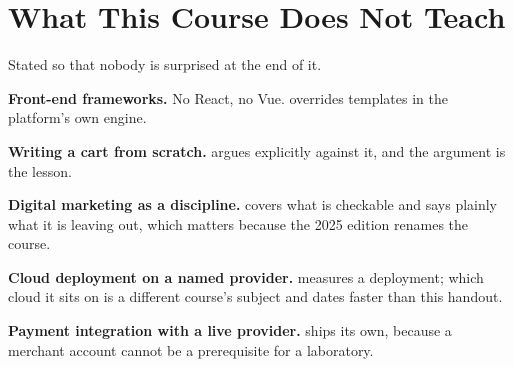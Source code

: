 \section{What This Course Does Not Teach}

Stated so that nobody is surprised at the end of it.

\begin{tight}
  \item \textbf{Front-end frameworks.} No React, no Vue.  overrides
        templates in the platform's own engine.
  \item \textbf{Writing a cart from scratch.}  argues
        explicitly against it, and the argument is the lesson.
  \item \textbf{Digital marketing as a discipline.}  covers what is
        checkable and says plainly what it is leaving out, which matters because
        the 2025 edition renames the course.
  \item \textbf{Cloud deployment on a named provider.}  measures
        a deployment; which cloud it sits on is a different course's subject
        and dates faster than this handout.
  \item \textbf{Payment integration with a live provider.} 
        ships its own, because a merchant account cannot be a prerequisite for
        a laboratory.
\end{tight}
